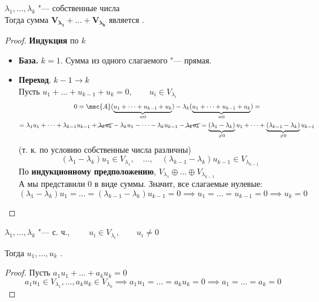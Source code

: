 \begin{theorem}
	$ \lambda_1, \dots, \lambda_k $ "---  собственные числа \\
	Тогда сумма $ \bm{V_{\lambda_1}} + \dots + \bm{V_{\lambda_k}} $ является .
\end{theorem}

\begin{proof}
	\textbf{Индукция} по $ k $
	\begin{itemize}
		\item \textbf{База.} $ k = 1 $. Сумма из одного слагаемого "--- прямая.
		\item \textbf{Переход}. $ k - 1 \to k $ \\
		Пусть $ u_1 + \dots + u_{k - 1} + u_k = 0, \qquad u_i \in V_{\lambda_i} $
		\begin{multline*}
			0 = \msc{A}(\underbrace{u_1 + \dots + u_{k - 1} + u_k}_{= 0 }) - \lambda_k(\underbrace{u_1 + \dots + u_{k - 1} + u_k}_{= 0 }) = \\
			= \lambda_1u_1 + \dots + \lambda_{k - 1}u_{k - 1} + \cancel{\lambda_ku_k} - \lambda_ku_1 - \dots - \lambda_ku_{k - 1} - \cancel{\lambda_ku_k} = \underbrace{(\lambda_1 - \lambda_k)}_{\ne 0}u_1 + \dots + \underbrace{(\lambda_{k - 1} - \lambda_k)}_{\ne 0}u_{k - 1}
		\end{multline*}
		(т. к. по условию собственные числа различны)
		$$ (\lambda_1 - \lambda_k)u_1 \in V_{\lambda_1}, \quad \dots, \quad (\lambda_{k - 1} - \lambda_k)u_{k - 1} \in V_{\lambda_{k - 1}} $$
		По \textbf{индукционному предположению}, $ V_{\lambda_1} \oplus \dots \oplus V_{\lambda_{k - 1}} $ \\
		А мы представили 0 в виде суммы. Значит, все слагаемые нулевые:
		$$ (\lambda_1 - \lambda_k)u_1 = \dots = (\lambda_{k - 1} - \lambda_k)u_{k - 1} = 0 \implies u_1 = \dots = u_{k - 1} = 0 \implies u_k = 0 $$
	\end{itemize}
\end{proof}

\begin{implication}
	$ \lambda_1, \dots, \lambda_k $ "---  с. ч., $ \qquad u_i \in V_{\lambda_i}, \qquad u_i \ne 0 $

	Тогда $ u_1, \dots, u_k $ .
\end{implication}

\begin{proof}
	Пусть $ a_1u_1 + \dots + a_ku_k = 0 $
	$$ a_1u_1 \in V_{\lambda_1}, \dots, a_ku_k \in V_{\lambda_k} \implies a_1u_1 = \dots = a_ku_k = 0 \implies a_1 = \dots = a_k = 0 $$
\end{proof}

